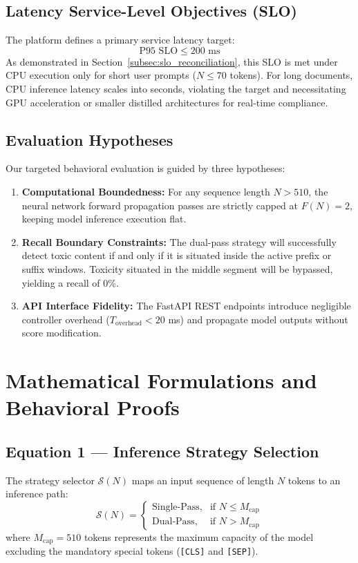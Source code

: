 \documentclass[10pt]{article}
\begin{document}
\subsection{Latency Service-Level Objectives (SLO)}
The platform defines a primary service latency target:
\begin{equation}
\text{P95 SLO} \le 200 \text{ ms}
\end{equation}
As demonstrated in Section~\ref{subsec:slo_reconciliation}, this SLO is met under CPU execution only for short user prompts ($N \le 70$ tokens). For long documents, CPU inference latency scales into seconds, violating the target and necessitating GPU acceleration or smaller distilled architectures for real-time compliance.

\subsection{Evaluation Hypotheses}
Our targeted behavioral evaluation is guided by three hypotheses:
\begin{enumerate}
\item \textbf{Computational Boundedness:} For any sequence length $N > 510$, the neural network forward propagation passes are strictly capped at $F(N) = 2$, keeping model inference execution flat.
\item \textbf{Recall Boundary Constraints:} The dual-pass strategy will successfully detect toxic content if and only if it is situated inside the active prefix or suffix windows. Toxicity situated in the middle segment will be bypassed, yielding a recall of 0\%.
\item \textbf{API Interface Fidelity:} The FastAPI REST endpoints introduce negligible controller overhead ($T_{\text{overhead}} < 20$ ms) and propagate model outputs without score modification.
\end{enumerate}

\section{Mathematical Formulations and Behavioral Proofs}

\subsection{Equation 1 --- Inference Strategy Selection}
The strategy selector $\mathcal{S}(N)$ maps an input sequence of length $N$ tokens to an inference path:
\begin{equation}
\mathcal{S}(N) = \begin{cases} \text{Single-Pass}, & \text{if } N \le M_{\text{cap}} \\ \text{Dual-Pass}, & \text{if } N > M_{\text{cap}} \end{cases}
\end{equation}
where $M_{\text{cap}} = 510$ tokens represents the maximum capacity of the model excluding the mandatory special tokens (\texttt{[CLS]} and \texttt{[SEP]}).
\end{document}
